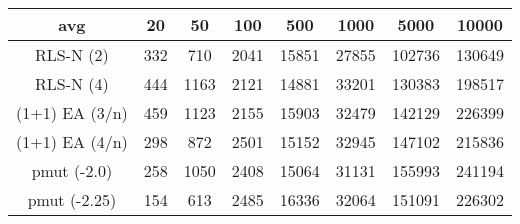 \begin{tabular}[h]{cccccccc}
avg&20&50&100&500&1000&5000&10000\\\hline
RLS-N (2)&332&710&2041&15851&27855&102736&130649\\
RLS-N (4)&444&1163&2121&14881&33201&130383&198517\\
(1+1) EA (3/n)&459&1123&2155&15903&32479&142129&226399\\
(1+1) EA (4/n)&298&872&2501&15152&32945&147102&215836\\
pmut (-2.0)&258&1050&2408&15064&31131&155993&241194\\
pmut (-2.25)&154&613&2485&16336&32064&151091&226302\\
\end{tabular}
